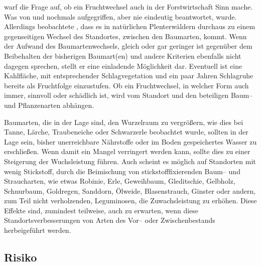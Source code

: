 \documentclass[twocolumn]{scrartcl}
\begin{document}
\cite{jentsch1911fruchtwechsel} warf die Frage auf, ob ein Fruchtwechsel auch in
der Forstwirtschaft Sinn mache. Was von \cite{sieber1919Holzartenwechsel} und
\cite{fabricius1924Holzartenwechsel} nochmals aufgegriffen, aber nie eindeutig
beantwortet, wurde. Allerdings beobachtete \cite{simak1951Baumartenwechsel},
dass es in natürlichen Plenterwäldern durchaus zu einem gegenseitigen Wechsel
des Standortes, zwischen den Baumarten, kommt. Wenn der Aufwand des
Baumartenwechsels, gleich oder gar geringer ist gegenüber dem Beibehalten der
bisherigen Baumart(en) und andere Kriterien ebenfalls nicht dagegen sprechen,
stellt er eine einladende Möglichkeit dar. Eventuell ist eine
\glqq{}Kahlfläche\grqq{}, mit entsprechender Schlagvegetation und ein paar
Jahren Schlagruhe bereits als Fruchtfolge einzustufen. Ob ein Fruchtwechsel, in
welcher Form auch immer, sinnvoll oder schädlich ist, wird vom Standort und den
beteiligen Baum-- und Pflanzenarten abhängen.

Baumarten, die in der Lage sind, den Wurzelraum zu vergrößern, wie dies
bei Tanne, Lärche, Traubeneiche oder Schwarzerle \cite[S.~114, 130,
150, 180]{koestler1969WurzelnDerWaldbaeume} beobachtet wurde, sollten
in der Lage sein, bisher unerreichbare Nährstoffe oder im Boden
gespeichertes Wasser zu erschließen. Wenn damit ein Mangel verringert werden kann, sollte dies zu einer Steigerung der Wuchsleistung führen.
Auch scheint es möglich auf Standorten mit wenig Stickstoff,
durch die Beimischung von stickstofffixierenden Baum-- und
Straucharten, wie etwas Robinie, Erle, Geweihbaum, Gleditschie,
Gelbholz, Schnurbaum, Goldregen, Sanddorn, Ölweide, Blasenstrauch,
Ginster oder andern, zum Teil nicht verholzenden, Leguminosen, die
Zuwachsleistung zu erhöhen. Diese Effekte sind, zumindest teilweise,
auch zu erwarten, wenn diese Standortsverbesserungen von Arten des Vor-- oder Zwischenbestands herbeigeführt werden.

\subsection{Risiko}
\label{ssec:risiko}
\end{document}
